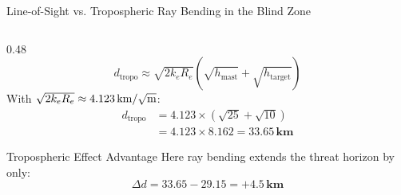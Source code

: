 \documentclass[aspectratio=169, 10pt]{beamer}
\newcommand{\km}{km} %
\begin{document}
\begin{frame}{Line-of-Sight vs. Tropospheric Ray Bending in the Blind Zone}
\begin{columns}[T]
\begin{column}{0.48\textwidth}
\begin{equation}
                d_{\text{tropo}} \approx \sqrt{2 k_e R_e}\left(\sqrt{h_{\text{mast}}} + \sqrt{h_{\text{target}}}\right)
            \end{equation}
            With $\sqrt{2 k_e R_e} \approx \SI{4.123}{\km\per\sqrt{\m}}$:
            \begin{align}
                d_{\text{tropo}} &= 4.123 \times \left(\sqrt{25} + \sqrt{10}\right) \nonumber \\
                &= 4.123 \times 8.162 = \mathbf{33.65\,\si{\km}}
            \end{align}
            \vspace{-2em}
            \begin{alertblock}{Tropospheric Effect Advantage}
                Here ray bending extends the threat horizon by only:
                \vspace{-1em}
                \begin{equation}
                    \Delta d = 33.65 - 29.15 = \mathbf{+4.5\,\si{\km}}
                \end{equation}
            \end{alertblock}
        \end{column}
    \end{columns}
\end{frame}
\end{document}
